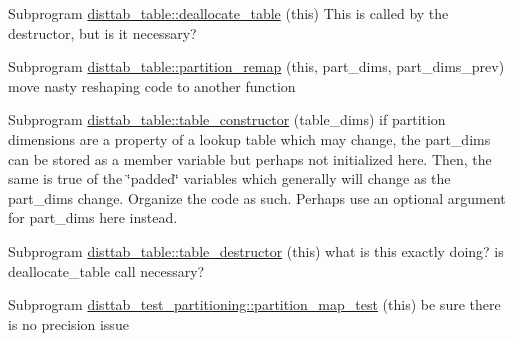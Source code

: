 
\begin{DoxyRefList}
\item[Subprogram \mbox{\hyperlink{namespacedisttab__table_ab8a2b8fd8aed669c2284a5b070f39492}{disttab\+\_\+table\+::deallocate\+\_\+table}} (this)]\label{todo__todo000004}%
%
This is called by the destructor, but is it necessary?  
\item[Subprogram \mbox{\hyperlink{namespacedisttab__table_a48241397777b4e586f1d9cf4389fae7d}{disttab\+\_\+table\+::partition\+\_\+remap}} (this, part\+\_\+dims, part\+\_\+dims\+\_\+prev)]\label{todo__todo000003}%
%
move nasty reshaping code to another function  
\item[Subprogram \mbox{\hyperlink{namespacedisttab__table_a51096402e00064f68a6c890b6c0d8500}{disttab\+\_\+table\+::table\+\_\+constructor}} (table\+\_\+dims)]\label{todo__todo000001}%
%
if partition dimensions are a property of a lookup table which may change, the part\+\_\+dims can be stored as a member variable but perhaps not initialized here. Then, the same is true of the \char`\"{}padded\char`\"{} variables which generally will change as the part\+\_\+dims change. Organize the code as such. Perhaps use an optional argument for part\+\_\+dims here instead.  
\item[Subprogram \mbox{\hyperlink{namespacedisttab__table_a00320b1b054be17b502e8bc01bdfb8cd}{disttab\+\_\+table\+::table\+\_\+destructor}} (this)]\label{todo__todo000002}%
%
what is this exactly doing? is deallocate\+\_\+table call necessary?  
\item[Subprogram \mbox{\hyperlink{namespacedisttab__test__partitioning_a9e95059f35b6a076292c47ebb6a31763}{disttab\+\_\+test\+\_\+partitioning\+::partition\+\_\+map\+\_\+test}} (this)]\label{todo__todo000005}%
%
be sure there is no precision issue 
\end{DoxyRefList}